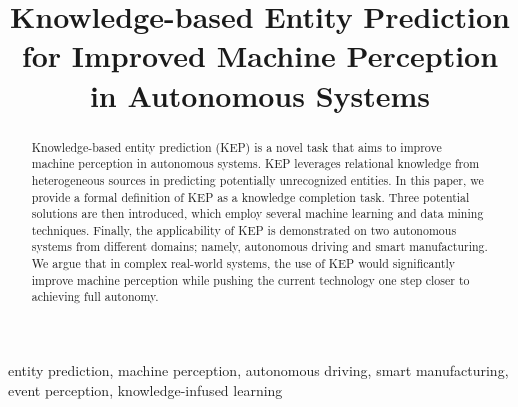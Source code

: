\documentclass[conference]{IEEEtran}
\begin{document}
\title{Knowledge-based Entity Prediction for Improved Machine Perception in Autonomous Systems}

\author{
\and
{}
\and
{}
}

\maketitle
\begin{abstract}
Knowledge-based entity prediction (KEP) is a novel task that aims to improve machine perception in autonomous systems. KEP leverages relational knowledge from heterogeneous sources in predicting potentially unrecognized entities. In this paper, we provide a formal definition of KEP as a knowledge completion task. Three potential solutions are then introduced, which employ several machine learning and data mining techniques. Finally, the applicability of KEP is demonstrated on two autonomous systems from different domains; namely, autonomous driving and smart manufacturing. We argue that in complex real-world systems, the use of KEP would significantly improve machine perception while pushing the current technology one step closer to achieving full autonomy.\\
\end{abstract}

\begin{IEEEkeywords}
entity prediction, machine perception, autonomous driving, smart manufacturing, event perception, knowledge-infused learning
\end{IEEEkeywords}

\end{document}
